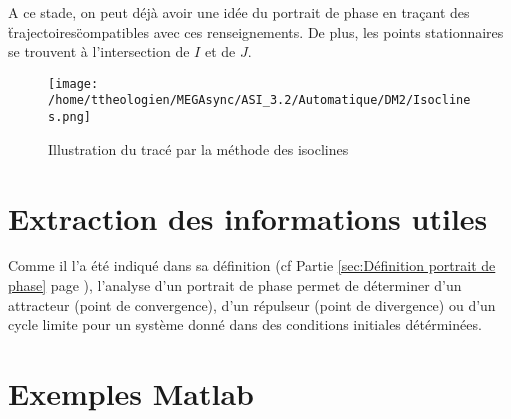 \documentclass[a4paper,12pt]{article}
\begin{document}
      \par A ce stade, on peut déjà avoir une idée du portrait de phase en traçant des \"trajectoires\" compatibles avec ces renseignements.
      De plus, les points stationnaires se trouvent à l'intersection de $I$ et de $J$.

      \begin{figure}[h]
        \caption{Illustration du tracé par la méthode des isoclines}
        \centering
        \texttt{[image: /home/ttheologien/MEGAsync/ASI\_3.2/Automatique/DM2/Isoclines.png]}
      \end{figure}

    \newpage

  \section{Extraction des informations utiles}
  \label{sec:Extraction des informations utiles}
    Comme il l'a été indiqué dans sa définition (cf Partie \ref{sec:Définition portrait de phase} page \pageref{sec:Définition portrait de phase}),
    l'analyse d'un portrait de phase permet de déterminer d'un attracteur (point de convergence), d'un répulseur (point de divergence) ou d'un cycle limite pour un système donné dans des conditions initiales détérminées.
    \newpage

  \section{Exemples Matlab}
  \label{sec:Exemples Matlab}
\end{document}

